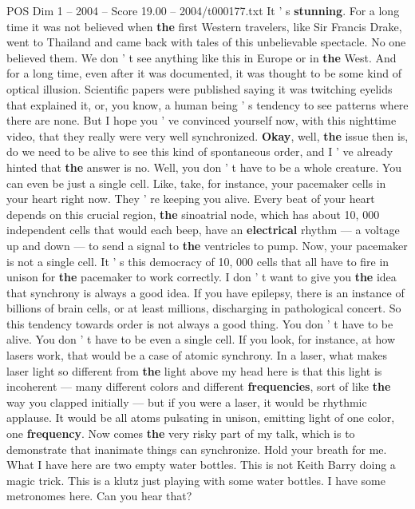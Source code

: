 \begin{textsample}{POS Dim 1 – 2004 – Score 19.00 – 2004/t000177.txt}
It ' s \textbf{stunning}.
For a long time it was not believed when \textbf{the} first Western travelers, like Sir Francis Drake, went to Thailand and came back with tales of this unbelievable spectacle.
No one believed them.
We don ' t see anything like this in Europe or in \textbf{the} West.
And for a long time, even after it was documented, it was thought to be some kind of optical illusion.
Scientific papers were published saying it was twitching eyelids that explained it, or, you know, a human being ' s tendency to see patterns where there are none.
But I hope you ' ve convinced yourself now, with this nighttime video, that they really were very well synchronized. \textbf{Okay}, well, \textbf{the} issue then is, do we need to be alive to see this kind of spontaneous order, and I ' ve already hinted that \textbf{the} answer is no.
Well, you don ' t have to be a whole creature.
You can even be just a single cell.
Like, take, for instance, your pacemaker cells in your heart right now.
They ' re keeping you alive.
Every beat of your heart depends on this crucial region, \textbf{the} sinoatrial node, which has about 10, 000 independent cells that would each beep, have an \textbf{electrical} rhythm — a voltage up and down — to send a signal to \textbf{the} ventricles to pump.
Now, your pacemaker is not a single cell.
It ' s this democracy of 10, 000 cells that all have to fire in unison for \textbf{the} pacemaker to work correctly.
I don ' t want to give you \textbf{the} idea that synchrony is always a good idea.
If you have epilepsy, there is an instance of billions of brain cells, or at least millions, discharging in pathological concert.
So this tendency towards order is not always a good thing.
You don ' t have to be alive.
You don ' t have to be even a single cell.
If you look, for instance, at how lasers work, that would be a case of atomic synchrony.
In a laser, what makes laser light so different from \textbf{the} light above my head here is that this light is incoherent — many different colors and different \textbf{frequencies}, sort of like \textbf{the} way you clapped initially — but if you were a laser, it would be rhythmic applause.
It would be all atoms pulsating in unison, emitting light of one color, one \textbf{frequency}.
Now comes \textbf{the} very risky part of my talk, which is to demonstrate that inanimate things can synchronize.
Hold your breath for me.
What I have here are two empty water bottles.
This is not Keith Barry doing a magic trick.
This is a klutz just playing with some water bottles.
I have some metronomes here.
Can you hear that?

\end{textsample}
